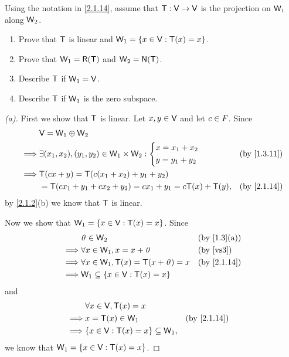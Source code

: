 \setcounter{ex}{25}
\begin{ex}\label{ex:2.1.26}
  Using the notation in \cref{2.1.14}, assume that \(\mathsf{T} : \mathsf{V} \to \mathsf{V}\) is the projection on \(\mathsf{W}_1\) along \(\mathsf{W}_2\).
  \begin{enumerate}
    \item Prove that \(\mathsf{T}\) is linear and \(\mathsf{W}_1 = \left\lbrace x \in \mathsf{V} : \mathsf{T}(x) = x\right\rbrace\).
    \item Prove that \(\W_1 = \rg{\T}\) and \(\W_2 = \ns{\T}\).
    \item Describe \(\mathsf{T}\) if \(\mathsf{W}_1 = \mathsf{V}\).
    \item Describe \(\mathsf{T}\) if \(\mathsf{W}_1\) is the zero subspace.
  \end{enumerate}
\end{ex}

\begin{proof}[(a)]
  First we show that \(\mathsf{T}\) is linear.
  Let \(x, y \in \mathsf{V}\) and let \(c \in \mathit{F}\).
  Since
  \begin{align*}
             & \V = \W_1 \oplus \W_2                                                                                           \\
    \implies & \exists (x_1, x_2), (y_1, y_2) \in \W_1 \times \W_2 : \begin{dcases}
      x = x_1 + x_2 \\
      y = y_1 + y_2
    \end{dcases} &  & \text{(by \cref{1.3.11})} \\
    \implies & \T(cx + y) = \T(c (x_1 + x_2) + y_1 + y_2)                                                                      \\
             & = \T(c x_1 + y_1 + c x_2 + y_2) = c x_1 + y_1 = c \T(x) + \T(y),                 &  & \text{(by \cref{2.1.14})}
  \end{align*}
  by \cref{2.1.2}(b) we know that \(\mathsf{T}\) is linear.

  Now we show that \(\mathsf{W}_1 = \left\lbrace x \in \mathsf{V} : \mathsf{T}(x) = x\right\rbrace\).
  Since
  \begin{align*}
             & \zv \in \W_2                                &  & \text{(by \cref{1.3}(a))} \\
    \implies & \forall x \in \W_1, x = x + \zv             &  & \text{(by \ref{vs3})}     \\
    \implies & \forall x \in \W_1, \T(x) = \T(x + \zv) = x &  & \text{(by \cref{2.1.14})} \\
    \implies & \W_1 \subseteq \set{x \in \V : \T(x) = x}
  \end{align*}
  and
  \begin{align*}
             & \forall x \in \V, \T(x) = x                                               \\
    \implies & x = \T(x) \in \W_1                         &  & \text{(by \cref{2.1.14})} \\
    \implies & \set{x \in \V : \T(x) = x} \subseteq \W_1,
  \end{align*}
  we know that \(\mathsf{W}_1 = \left\lbrace x \in \mathsf{V} : \mathsf{T}(x) = x\right\rbrace\).
\end{proof}

